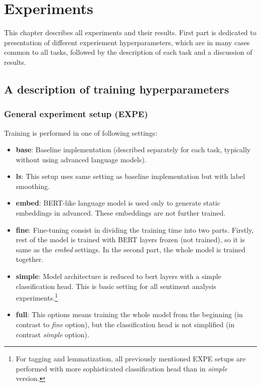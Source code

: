 \chapter{Experiments}
\label{chap:exp}
This chapter describes all experiments and their results. First part is dedicated to presentation of different experiement hyperparameters, which are in many cases common to all tasks, followed by the description of each task and a discussion of results.
\section{A description of training hyperparameters}
\label{sec:expe}
\subsection{General experiment setup (EXPE)}
Training is performed in one of following settings:
\begin{itemize}
\item \textbf{base}: Baseline implementation (described separately for each task, typically without using advanced language models).
\item \textbf{ls}: This setup uses same setting as baseline implementation but with label smoothing.
\item \textbf{embed}: BERT-like language model is used only to generate static embeddings in advanced. These embeddings are not further trained.
\item \textbf{fine}: Fine-tuning consist in dividing the training time into two parts. Firstly, rest of the model is trained with BERT layers frozen (not trained), so it is same as the \textit{embed} settings. In the second part, the whole model is trained together.
\item \textbf{simple}: Model architecture is reduced to bert layers with a simple classification head. This is basic setting for all sentiment analysis experiments.\footnote{For tagging and lemmatization, all previously mentioned EXPE setups are performed with more sophisticated classification head than in \textit{simple} version.} 
\item \textbf{full}: This options means training the whole model from the beginning (in contrast to \textit{fine} option), but the classification head is not simplified (in contrast \textit{simple} option).
\end{itemize}
